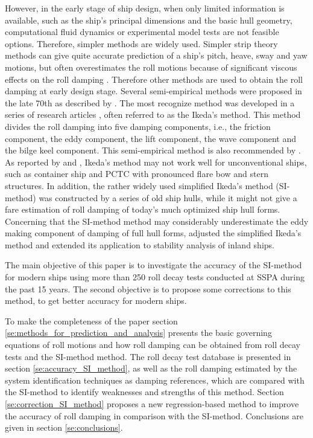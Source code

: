 However, in the early stage of ship design, when only limited information is available, such as the ship's principal dimensions and the basic hull geometry, computational fluid dynamics or experimental model tests are not feasible options.
Therefore, simpler methods are widely used. Simpler strip theory methods can give quite accurate prediction of a ship's pitch, heave, sway and yaw motions, but often overestimates the roll motions because of significant viscous effects on the roll damping \parencite{kawahara_simple_2011}. Therefore other methods are used to obtain the roll damping at early design stage. Several semi-empirical methods were proposed in the late 70th as described by  \parencite{himeno_prediction_1981}. The most recognize method was developed in a series of research articles \parencite{ikeda_roll_1978,ikeda_eddy_1978,ikeda_roll_1979,ikeda_components_1978,ikeda_velocity_1979}, often referred to as the Ikeda's method. This method divides the roll damping into five damping components, i.e., the friction component, the eddy component, the lift component, the wave component and the bilge keel component. This semi-empirical method is also recommended by \parencite{ittc_ittc_2011}. As reported by  \parencite{kawahara_simple_2011} and \parencite{soder_ikeda_2019}, Ikeda's method may not work well for unconventional ships, such as container ship and PCTC with pronounced flare bow and stern structures. In addition, the rather widely used simplified Ikeda's method \parencite{kawahara_simple_2011} (SI-method) was constructed by a series of old ship hulls, while it might not give a fare estimation of roll damping of today's much optimized ship hull forms.
Concerning that the SI-method method may considerably underestimate the eddy making component of damping of full hull forms, \parencite{rudakovic_application_2017} adjusted the simplified Ikeda’s method and  extended its application to stability analysis of inland ships.

The main objective of this paper is to investigate the accuracy of the SI-method for modern ships using more than 250 roll decay tests conducted at SSPA during the past 15 years. The second objective is to propose some corrections to this method, to get better accuracy for modern ships. 

To make the completeness of the paper section \ref{se:methods_for_prediction_and_analysis} presents the basic governing equations of roll motions and how roll damping can be obtained from roll decay tests and the SI-method method. 
The roll decay test database is presented in section \ref{se:accuracy_SI_method}, as well as the roll damping estimated by the system identification techniques as damping references, which are compared with the SI-method to identify weaknesses and strengths of this method. Section \ref{se:correction_SI_method} proposes a new regression-based method to improve the accuracy of roll damping in comparison with the SI-method. Conclusions are given in section \ref{se:conclusions}.  
